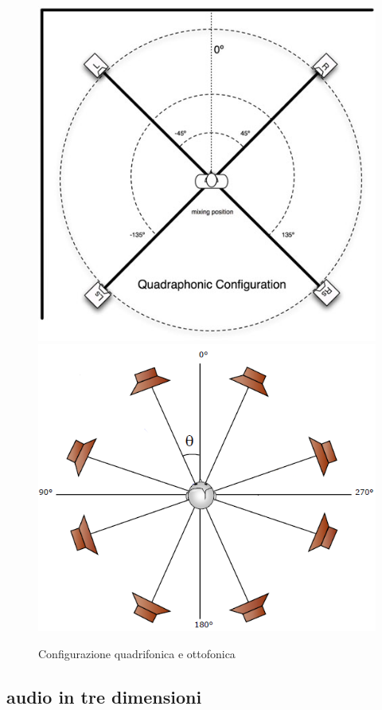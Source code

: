 \documentclass[12pt,a4paper]{report}
\begin{document}
\begin{figure}[htbp]
	\centering
	\includegraphics[scale=0.35]{figures/quad.jpg}\includegraphics[scale=0.55]{figures/ottofonia.png}
	\caption {Configurazione quadrifonica e ottofonica} 
	\label{fig:quadrifonia}
	\end{figure}

\subsection{audio in tre dimensioni}
\end{document}
